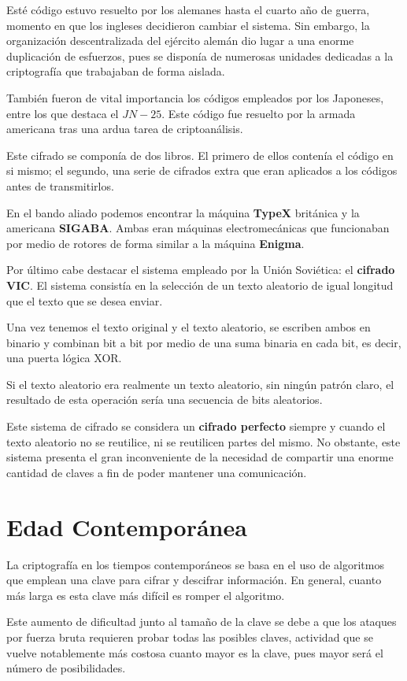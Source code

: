 \documentclass[nochap]{apuntesURJC}
\begin{document}
Esté código estuvo resuelto por los alemanes hasta el cuarto año de guerra, momento en que los ingleses decidieron cambiar el sistema. Sin embargo, la organización descentralizada del ejército alemán dio lugar a una enorme duplicación de esfuerzos, pues se disponía de numerosas unidades dedicadas a la criptografía que trabajaban de forma aislada.

También fueron de vital importancia los códigos empleados por los Japoneses, entre los que destaca el $JN-25$. Este código fue resuelto por la armada americana tras una ardua tarea de criptoanálisis.

Este cifrado se componía de dos libros. El primero de ellos contenía el código en si mismo; el segundo, una serie de cifrados extra que eran aplicados a los códigos antes de transmitirlos.

En el bando aliado podemos encontrar la máquina \textbf{TypeX} británica y la americana \textbf{SIGABA}. Ambas eran máquinas electromecánicas que funcionaban por medio de rotores de forma similar a la máquina \textbf{Enigma}.

Por último cabe destacar el sistema empleado por la Unión Soviética: el \textbf{cifrado VIC}. El sistema consistía en la selección de un texto aleatorio de igual longitud que el texto que se desea enviar.

Una vez tenemos el texto original y el texto aleatorio, se escriben ambos en binario y combinan bit a bit por medio de una suma binaria en cada bit, es decir, una puerta lógica XOR.

Si el texto aleatorio era realmente un texto aleatorio, sin ningún patrón claro, el resultado de esta operación sería una secuencia de bits aleatorios.

Este sistema de cifrado se considera un \textbf{cifrado perfecto} siempre y cuando el texto aleatorio no se reutilice, ni se reutilicen partes del mismo. No obstante, este sistema presenta el gran inconveniente de la necesidad de compartir una enorme cantidad de claves a fin de poder mantener una comunicación.

\section{Edad Contemporánea}
La criptografía en los tiempos contemporáneos se basa en el uso de algoritmos que emplean una clave para cifrar y descifrar información. 
%
En general, cuanto más larga es esta clave más difícil es romper el algoritmo.

Este aumento de dificultad junto al tamaño de la clave se debe a que los ataques por fuerza bruta requieren probar todas las posibles claves, actividad que se vuelve notablemente más costosa cuanto mayor es la clave, pues mayor será el número de posibilidades.
\end{document}
